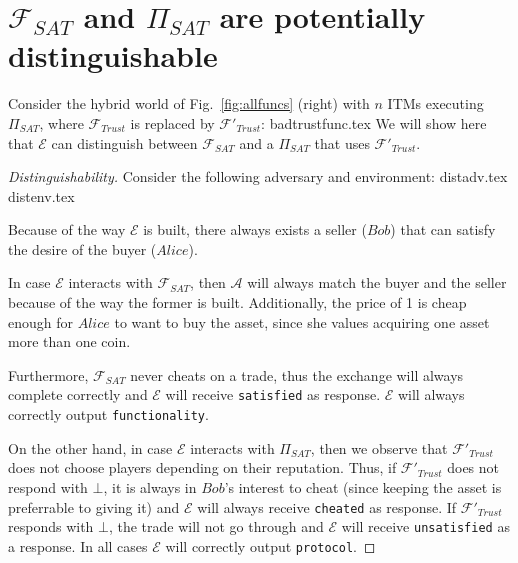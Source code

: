 \section{$\mathcal{F}_{SAT}$ and $\Pi_{SAT}$ are potentially distinguishable}
  Consider the hybrid world of Fig.~\ref{fig:allfuncs} (right) with $n$ ITMs executing
  $\Pi_{SAT}$, where $\mathcal{F}_{Trust}$ is replaced by $\mathcal{F}'_{Trust}$:
  {badtrustfunc.tex}
  We will show here that $\mathcal{E}$ can distinguish between $\mathcal{F}_{SAT}$ and a
  $\Pi_{SAT}$ that uses $\mathcal{F}'_{Trust}$.
  \begin{proof}[Distinguishability]
    Consider the following adversary and environment:
    {distadv.tex}
    {distenv.tex}

    Because of the way $\mathcal{E}$ is built, there always exists a seller ($Bob$) that
    can satisfy the desire of the buyer ($Alice$).

    In case $\mathcal{E}$ interacts with $\mathcal{F}_{SAT}$, then $\mathcal{A}$ will
    always match the buyer and the seller because of the way the former is built.
    Additionally, the price of 1 is cheap enough for $Alice$ to want to buy the asset,
    since she values acquiring one asset more than one coin.

    Furthermore, $\mathcal{F}_{SAT}$ never cheats on a trade, thus the exchange will
    always complete correctly and $\mathcal{E}$ will receive \texttt{satisfied} as
    response. $\mathcal{E}$ will always correctly output \texttt{functionality}.

    On the other hand, in case $\mathcal{E}$ interacts with $\Pi_{SAT}$, then we observe
    that $\mathcal{F}'_{Trust}$ does not choose players depending on their reputation.
    Thus, if $\mathcal{F}'_{Trust}$ does not respond with $\bot$, it is always in $Bob$'s
    interest to cheat (since keeping the asset is preferrable to giving it) and
    $\mathcal{E}$ will always receive \texttt{cheated} as response. If
    $\mathcal{F}'_{Trust}$ responds with $\bot$, the trade will not go through and
    $\mathcal{E}$ will receive \texttt{unsatisfied} as a response. In all cases
    $\mathcal{E}$ will correctly output \texttt{protocol}.
  \end{proof}
